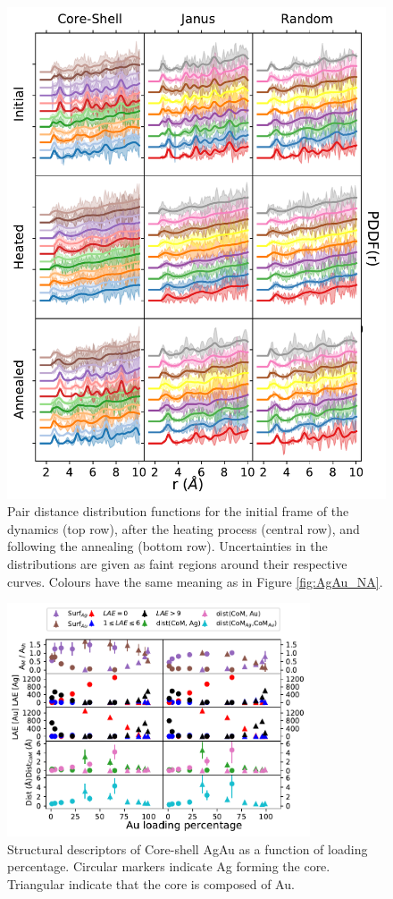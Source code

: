 \begin{figure}
    \centering
    \includegraphics{figures/MD/Alloys/Melt_Ag-Au.pdf}
    \caption{Pair distance distribution functions for the initial frame of the dynamics (top row), after the heating process (central row), and following the annealing (bottom row). Uncertainties in the distributions are given as faint regions around their respective curves. Colours have the same meaning as in Figure \ref{fig:AgAu_NA}. }
    \label{fig:AgAu_PDF}
\end{figure}

\begin{figure}
    \centering
    \includegraphics[width=0.8\textwidth]{figures/MD/Alloys/Core-Shell_Ag-Au.pdf}
    \caption{Structural descriptors of Core-shell AgAu as a function of loading percentage. Circular markers indicate Ag forming the core. Triangular indicate that the core is composed of Au.}
    \label{fig:AgAuCS_Dyn}
\end{figure}


